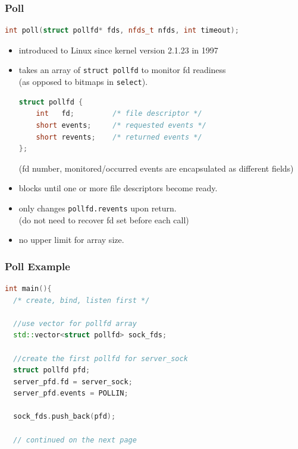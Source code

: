 \documentclass[aspectratio=43]{beamer}
\begin{document}
\begin{frame}[fragile]
  \frametitle{Poll}
  \begin{lstlisting}[language=C++,basicstyle=\ttfamily\footnotesize,commentstyle=\color{commgreen},keywordstyle=\color{blue},breaklines=true]
int poll(struct pollfd* fds, nfds_t nfds, int timeout);   
\end{lstlisting}
   \begin{itemize}
	 \item introduced to Linux since kernel version 2.1.23 in 1997
	 \item takes an array of {\tt struct pollfd} to monitor fd readiness\\{\scriptsize (as opposed to bitmaps in {\tt select})}.
	 \begin{lstlisting}[language=C++,basicstyle=\ttfamily\scriptsize,commentstyle=\color{commgreen},keywordstyle=\color{blue},breaklines=true]
struct pollfd {
    int   fd;         /* file descriptor */
    short events;     /* requested events */
    short revents;    /* returned events */
};
\end{lstlisting}
	 {\scriptsize (fd number, monitored/occurred events are encapsulated as different fields) }
	 \item blocks until one or more file descriptors become ready.
	 \item only changes {\tt pollfd.revents} upon return.\\ {\scriptsize (do not need to recover fd set before each call)}
	 \item no upper limit for array size.
   \end{itemize}
\end{frame}

\begin{frame}[fragile]
  \frametitle{Poll Example}
\begin{lstlisting}[language=C++,basicstyle=\ttfamily\footnotesize,commentstyle=\color{commgreen},keywordstyle=\color{blue},breaklines=true]
int main(){
  /* create, bind, listen first */
    
  //use vector for pollfd array
  std::vector<struct pollfd> sock_fds;

  //create the first pollfd for server_sock
  struct pollfd pfd;
  server_pfd.fd = server_sock;
  server_pfd.events = POLLIN;
    
  sock_fds.push_back(pfd);

  // continued on the next page
  \end{lstlisting}
\end{frame}
\end{document}
